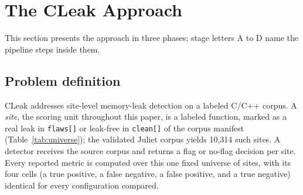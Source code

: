 \documentclass[a4paper]{llncs}
\begin{document}
\begin{table}[htbp]
\centering
\caption{Directional comparison of leak-detection systems. The systems
target different corpora and scoring protocols, so cells indicate
orientation rather than directly comparable measurements.}
\label{tab:taxonomy}
\footnotesize
{}
\end{table}

\section{The CLeak Approach}
\label{sec:arch}

This section presents the approach in three phases; stage letters A
to D name the pipeline steps inside them.

\subsection{Problem definition}
\label{sec:problem}

CLeak addresses site-level memory-leak detection on a labeled C/C++
corpus. A \emph{site}, the scoring unit throughout this paper, is a
labeled function, marked as a real leak in \texttt{flaws[]} or
leak-free in \texttt{clean[]} of the corpus manifest
(Table~\ref{tab:universe}); the validated Juliet corpus yields 10{,}314
such sites. A detector receives the source corpus and returns a flag or
no-flag decision per site. Every reported metric is computed over this
one fixed universe of sites, with its four cells (a true positive, a
false negative, a false positive, and a true negative) identical for
every configuration compared.
\end{document}
